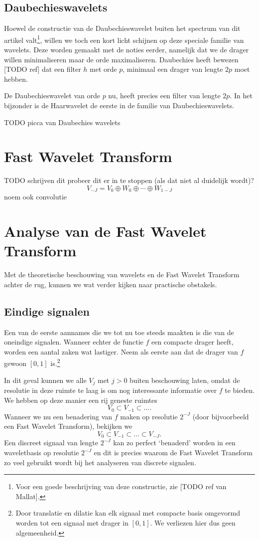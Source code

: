 \documentclass[11pt]{amsart}
\begin{document}
\subsection{Daubechieswavelets}
Hoewel de constructie van de Daubechieswavelet buiten het spectrum van dit artikel valt\footnote{Voor een goede beschrijving van deze constructie, zie [TODO ref van Mallat].}, willen we toch een kort licht schijnen op deze speciale familie van wavelets. Deze worden gemaakt met de noties eerder, namelijk dat we de drager willen minimaliseren maar de orde maximaliseren. Daubechies heeft bewezen [TODO ref] dat een filter $h$ met orde $p$, minimaal een drager van lengte $2p$ moet hebben. 

De Daubechieswavelet van orde $p$ nu, heeft precies een filter van lengte $2p$. In het bijzonder is de Haarwavelet de eerste in de familie van Daubechieswavelets.

TODO picca van Daubechies wavelets

\section{Fast Wavelet Transform}
TODO schrijven dit
probeer dit er in te stoppen (als dat niet al duidelijk wordt)?
\[
	V_{-J} = V_0 \oplus W_0 \oplus \cdots \oplus W_{1-J}
\]
noem ook convolutie

\section{Analyse van de Fast Wavelet Transform}
Met de theoretische beschouwing van wavelets en de Fast Wavelet Transform achter de rug, kunnen we wat verder kijken naar practische obstakels.

\subsection{Eindige signalen} 
Een van de eerste aannames die we tot nu toe steeds maakten is die van de oneindige signalen. Wanneer echter de functie $f$ een compacte drager heeft, worden een aantal zaken wat lastiger. Neem als eerste aan dat de drager van $f$ gewoon $[0,1]$ is.\footnote{Door translatie en dilatie kan elk signaal met compacte basis omgevormd worden tot een signaal met drager in $[0,1]$. We verliezen hier dus geen algemeenheid.}

In dit geval kunnen we alle $V_j$ met $j > 0$ buiten beschouwing laten, omdat de resolutie in deze ruimte te laag is om nog interessante informatie over $f$ te bieden. We hebben op deze manier een rij geneste ruimtes
\[
V_0 \subset V_{-1} \subset \ldots.
\]
Wanneer we nu een benadering van $f$ maken op resolutie $2^{-J}$ (door bijvoorbeeld een Fast Wavelet Transform), bekijken we
\[
	V_0 \subset V_{-1} \subset \ldots \subset V_{-J}.
\]
Een discreet signaal van lengte $2^{-J}$ kan zo perfect `benaderd' worden in een waveletbasis op resolutie $2^{-J}$ en dit is precies waarom de Fast Wavelet Transform zo veel gebruikt wordt bij het analyseren van discrete signalen.
\end{document}
